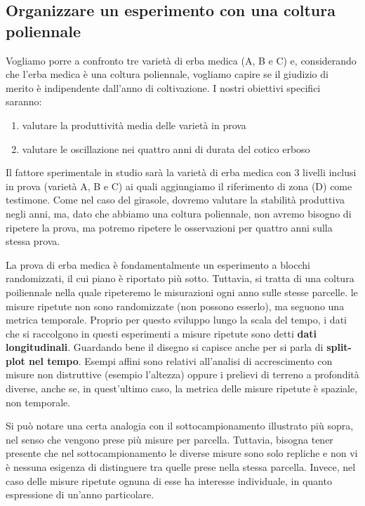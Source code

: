 \documentclass[a4paper,12pt,oneside]{book}
\providecommand{\tightlist}{%
  \setlength{\itemsep}{0pt}\setlength{\parskip}{0pt}}
\theoremstyle{definition}
\theoremstyle{definition}
\theoremstyle{definition}
\theoremstyle{remark}
\begin{document}
\subsection{Organizzare un esperimento con una coltura
poliennale}\label{organizzare-un-esperimento-con-una-coltura-poliennale}

Vogliamo porre a confronto tre varietà di erba medica (A, B e C) e,
considerando che l'erba medica è una coltura poliennale, vogliamo capire
se il giudizio di merito è indipendente dall'anno di coltivazione. I
nostri obiettivi specifici saranno:

\begin{enumerate}
\def\labelenumi{\arabic{enumi}.}
\tightlist
\item
  valutare la produttività media delle varietà in prova
\item
  valutare le oscillazione nei quattro anni di durata del cotico erboso
\end{enumerate}

Il fattore sperimentale in studio sarà la varietà di erba medica con 3
livelli inclusi in prova (varietà A, B e C) ai quali aggiungiamo il
riferimento di zona (D) come testimone. Come nel caso del girasole,
dovremo valutare la stabilità produttiva negli anni, ma, dato che
abbiamo una coltura poliennale, non avremo bisogno di ripetere la prova,
ma potremo ripetere le osservazioni per quattro anni sulla stessa prova.

La prova di erba medica è fondamentalmente un esperimento a blocchi
randomizzati, il cui piano è riportato più sotto. Tuttavia, si tratta di
una coltura poiliennale nella quale ripeteremo le misurazioni ogni anno
sulle stesse parcelle. le misure ripetute non sono randomizzate (non
possono esserlo), ma seguono una metrica temporale. Proprio per questo
sviluppo lungo la scala del tempo, i dati che si raccolgono in questi
esperimenti a misure ripetute sono detti \textbf{dati longitudinali}.
Guardando bene il disegno si capisce anche per si parla di
\textbf{split-plot nel tempo}. Esempi affini sono relativi all'analisi
di accrescimento con misure non distruttive (esempio l'altezza) oppure i
prelievi di terreno a profondità diverse, anche se, in quest'ultimo
caso, la metrica delle misure ripetute è spaziale, non temporale.

Si può notare una certa analogia con il sottocampionamento illustrato
più sopra, nel senso che vengono prese più misure per parcella.
Tuttavia, bisogna tener presente che nel sottocampionamento le diverse
misure sono solo repliche e non vi è nessuna esigenza di distinguere tra
quelle prese nella stessa parcella. Invece, nel caso delle misure
ripetute ognuna di esse ha interesse individuale, in quanto espressione
di un'anno particolare.
\end{document}
